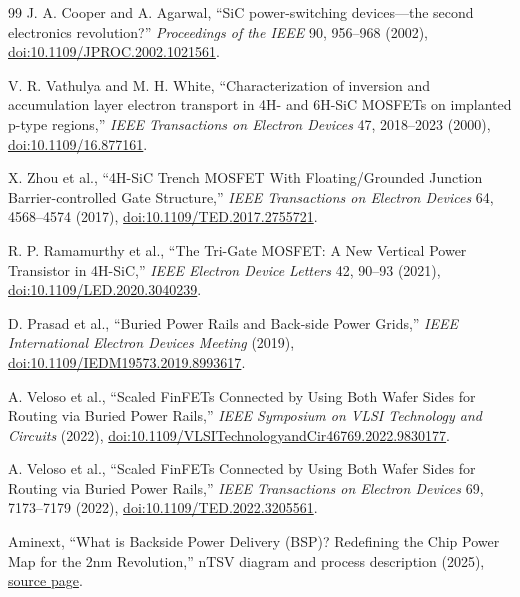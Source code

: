 \documentclass[11pt]{article}
\begin{document}
\begin{thebibliography}{99}
J. A. Cooper and A. Agarwal, ``SiC power-switching devices---the second
electronics revolution?'' \emph{Proceedings of the IEEE} 90, 956--968 (2002),
\href{https://doi.org/10.1109/JPROC.2002.1021561}{doi:10.1109/JPROC.2002.1021561}.

V. R. Vathulya and M. H. White, ``Characterization of inversion and
accumulation layer electron transport in 4H- and 6H-SiC MOSFETs on implanted
p-type regions,'' \emph{IEEE Transactions on Electron Devices} 47,
2018--2023 (2000), \href{https://doi.org/10.1109/16.877161}{doi:10.1109/16.877161}.

X. Zhou et al., ``4H-SiC Trench MOSFET With Floating/Grounded Junction
Barrier-controlled Gate Structure,'' \emph{IEEE Transactions on Electron
Devices} 64, 4568--4574 (2017),
\href{https://doi.org/10.1109/TED.2017.2755721}{doi:10.1109/TED.2017.2755721}.

R. P. Ramamurthy et al., ``The Tri-Gate MOSFET: A New Vertical Power
Transistor in 4H-SiC,'' \emph{IEEE Electron Device Letters} 42, 90--93 (2021),
\href{https://doi.org/10.1109/LED.2020.3040239}{doi:10.1109/LED.2020.3040239}.

D. Prasad et al., ``Buried Power Rails and Back-side Power Grids,''
\emph{IEEE International Electron Devices Meeting} (2019),
\href{https://doi.org/10.1109/IEDM19573.2019.8993617}{doi:10.1109/IEDM19573.2019.8993617}.

A. Veloso et al., ``Scaled FinFETs Connected by Using Both Wafer Sides for
Routing via Buried Power Rails,'' \emph{IEEE Symposium on VLSI Technology and
Circuits} (2022),
\href{https://doi.org/10.1109/VLSITechnologyandCir46769.2022.9830177}{doi:10.1109/VLSITechnologyandCir46769.2022.9830177}.

A. Veloso et al., ``Scaled FinFETs Connected by Using Both Wafer Sides for
Routing via Buried Power Rails,'' \emph{IEEE Transactions on Electron Devices}
69, 7173--7179 (2022), \href{https://doi.org/10.1109/TED.2022.3205561}{doi:10.1109/TED.2022.3205561}.

Aminext, ``What is Backside Power Delivery (BSP)? Redefining the Chip Power
Map for the 2nm Revolution,'' nTSV diagram and process description (2025),
\href{https://www.aminext.blog/en/post/backside-power-delivery-bsp-explained-1}{source page}.

\end{thebibliography}
\normalsize
\end{document}
